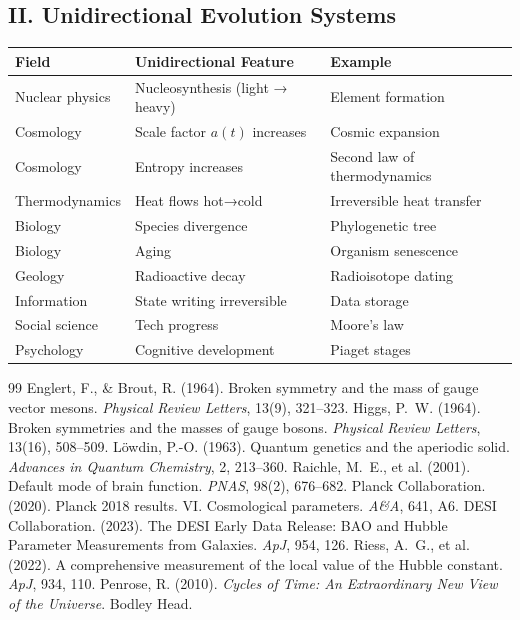 \documentclass[10pt,a4paper]{article}
\begin{document}
\subsection{II. Unidirectional Evolution Systems}
\begin{table}[h!]
\centering
\small
\begin{tabular}{lll}
\toprule
Field & Unidirectional Feature & Example \\
\midrule
Nuclear physics & Nucleosynthesis (light → heavy) & Element formation \\
Cosmology & Scale factor $a(t)$ increases & Cosmic expansion \\
Cosmology & Entropy increases & Second law of thermodynamics \\
Thermodynamics & Heat flows hot→cold & Irreversible heat transfer \\
Biology & Species divergence & Phylogenetic tree \\
Biology & Aging & Organism senescence \\
Geology & Radioactive decay & Radioisotope dating \\
Information & State writing irreversible & Data storage \\
Social science & Tech progress & Moore’s law \\
Psychology & Cognitive development & Piaget stages \\
\bottomrule
\end{tabular}
\end{table}

\begin{thebibliography}{99}
 Englert, F., \& Brout, R. (1964). Broken symmetry and the mass of gauge vector mesons. \emph{Physical Review Letters}, 13(9), 321–323.
 Higgs, P.~W. (1964). Broken symmetries and the masses of gauge bosons. \emph{Physical Review Letters}, 13(16), 508–509.
 Löwdin, P.-O. (1963). Quantum genetics and the aperiodic solid. \emph{Advances in Quantum Chemistry}, 2, 213–360.
 Raichle, M.~E., et al. (2001). Default mode of brain function. \emph{PNAS}, 98(2), 676–682.
 Planck Collaboration. (2020). Planck 2018 results. VI. Cosmological parameters. \emph{A\&A}, 641, A6.
 DESI Collaboration. (2023). The DESI Early Data Release: BAO and Hubble Parameter Measurements from Galaxies. \emph{ApJ}, 954, 126.
 Riess, A.~G., et al. (2022). A comprehensive measurement of the local value of the Hubble constant. \emph{ApJ}, 934, 110.
 Penrose, R. (2010). \emph{Cycles of Time: An Extraordinary New View of the Universe}. Bodley Head.
\end{thebibliography}
\end{document}
